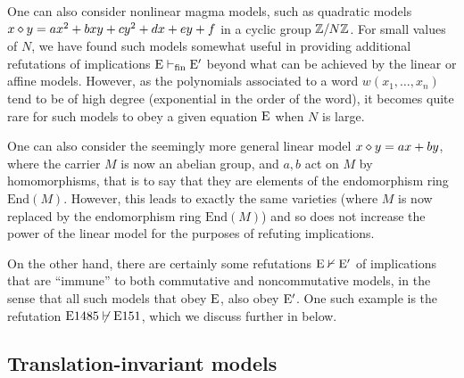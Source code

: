 \begin{remark}  One can also consider nonlinear magma models, such as quadratic models $x \diamond y = ax^2 + bxy + cy^2 + dx + ey + f$ in a cyclic group $\mathbb{Z}/N\mathbb{Z}$.  For small values of $N$, we have found such models somewhat useful in providing additional refutations of implications $\mathrm{E} \vdash_{\mathrm{fin}} {\mathrm{E}'}$ beyond what can be achieved by the linear or affine models.  However, as the polynomials associated to a word $w(x_1,\dots,x_n)$ tend to be of high degree (exponential in the order of the word), it becomes quite rare for such models to obey a given equation $\mathrm{E}$ when $N$ is large.
\end{remark}

\begin{remark} One can also consider the seemingly more general linear model $x \diamond y = ax + by$, where the carrier $M$ is now an abelian group, and $a,b$ act on $M$ by homomorphisms, that is to say that they are elements of the endomorphism ring $\mathrm{End}(M)$.  However, this leads to exactly the same varieties  (where $M$ is now replaced by the endomorphism ring $\mathrm{End}(M)$) and so does not increase the power of the linear model for the purposes of refuting implications.
\end{remark}

On the other hand, there are certainly some refutations $\mathrm{E} \nvdash {\mathrm{E}'}$ of implications that are ``immune'' to both commutative and noncommutative models, in the sense that all such models that obey $\mathrm{E}$, also obey ${\mathrm{E}'}$.  One such example is the refutation $\mathrm{E}1485 \not \vdash \mathrm{E}151$, which we discuss further in  below.

\subsection{Translation-invariant models}\label{translation-sec}


